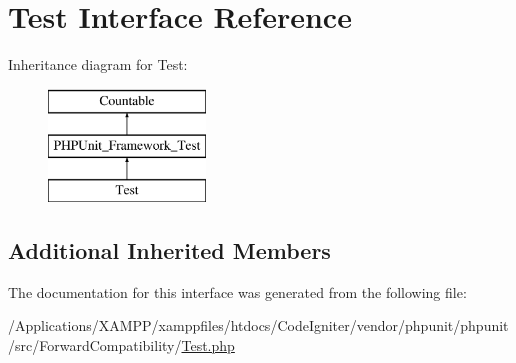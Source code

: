 \hypertarget{interface_p_h_p_unit_1_1_framework_1_1_test}{}\section{Test Interface Reference}
\label{interface_p_h_p_unit_1_1_framework_1_1_test}
Inheritance diagram for Test\+:\begin{figure}[H]
\begin{center}
\leavevmode
\includegraphics[height=3.000000cm]{interface_p_h_p_unit_1_1_framework_1_1_test}
\end{center}
\end{figure}
\subsection*{Additional Inherited Members}


The documentation for this interface was generated from the following file\+:\begin{DoxyCompactItemize}
\item 
/\+Applications/\+X\+A\+M\+P\+P/xamppfiles/htdocs/\+Code\+Igniter/vendor/phpunit/phpunit/src/\+Forward\+Compatibility/\mbox{\hyperlink{_forward_compatibility_2_test_8php}{Test.\+php}}\end{DoxyCompactItemize}
